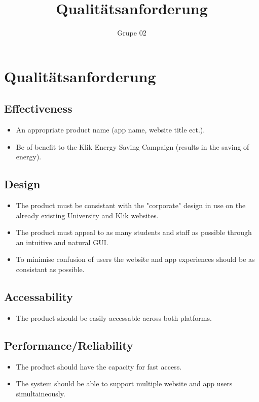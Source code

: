 \documentclass[10pt,a4paper]{article}
\author{Grupe 02}
\title{Qualitätsanforderung}
\begin{document}
\section*{Qualit{\"a}tsanforderung}
\subsection{Effectiveness}
\begin{itemize}
\item
An appropriate product name (app name, website title ect.).
\item
Be of benefit to the Klik Energy Saving Campaign (results in the saving of energy).
\end{itemize}
\subsection{Design}
\begin{itemize}
\item
The product must be consistant with the "corporate" design in use on the already existing University and Klik websites.
\item
The product must appeal to as many students and staff as possible through an intuitive and natural GUI.
\item
To minimise confusion of users the website and app experiences should be as consistant as possible.
\end{itemize}
\subsection{Accessability}
\begin{itemize}
\item
The product should be easily accessable across both platforms.
\end{itemize}
\subsection{Performance/Reliability}
\begin{itemize}
\item
The product should have the capacity for fast access.
\item
The system should be able to support multiple website and app users simultaineously.
\end{itemize}
\end{document}
